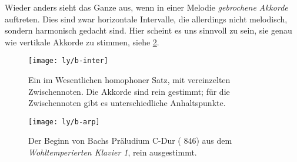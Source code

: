 Wieder anders sieht das Ganze aus, wenn in einer Melodie \emph{gebrochene
  Akkorde} auftreten. Dies sind zwar horizontale Intervalle, die allerdings
nicht melodisch, sondern harmonisch gedacht sind. Hier scheint es uns sinnvoll
zu sein, sie genau wie vertikale Akkorde zu stimmen, siehe \cref{fig:arp}.

\begin{figure}
  \centering
  \texttt{[image: ly/b-inter]}
  \caption{Ein im Wesentlichen homophoner Satz, mit vereinzelten
    Zwischennoten. Die Akkorde sind rein gestimmt; für die Zwischennoten gibt
    es unterschiedliche Anhaltspunkte.}\label{fig:inter}
\end{figure}

\begin{figure}
  \centering
  \texttt{[image: ly/b-arp]}
  \caption{Der Beginn von Bachs Präludium C-Dur ( 846) aus dem
    \emph{Wohltemperierten Klavier 1}, rein ausgestimmt.}\label{fig:arp}
\end{figure}

